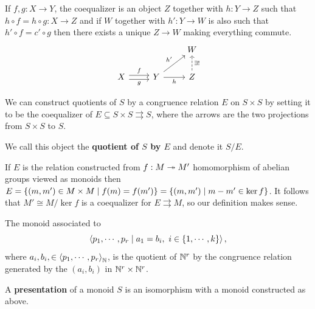 \begin{definition}[Coequalizer]
If $f,g:X\to Y$, the coequalizer is an object $Z$ together with $h:Y\to Z$ such that $h\circ f=h\circ g:X\to Z$ and if $W$ together with $h':Y\to W$ is also such that $h'\circ f=c'\circ g$ then there exists a unique $Z\to W$ making everything commute.
\[\begin{tikzcd}
	&& W \\
	X & Y & Z
	\arrow["f", shift left, from=2-1, to=2-2]
	\arrow["g"', shift right, from=2-1, to=2-2]
	\arrow["{h'}", from=2-2, to=1-3]
	\arrow["h"', from=2-2, to=2-3]
	\arrow["{\exists!}"', dashed, from=2-3, to=1-3]
\end{tikzcd}\]
\end{definition}

\begin{fact}[]
We can construct quotients of $S$ by a congruence relation $E$ on $S\times S$ by setting it to be the coequalizer of $E\subseteq S\times S\rightrightarrows S$, where the arrows are the two projections from $S\times S$ to $S$.

We call this object the \textbf{quotient of $S$ by $E$} and denote it $S/E$.
\end{fact}

\begin{remark}
If $E$ is the relation constructed from $f:M\twoheadrightarrow M'$ homomorphism of abelian groups viewed as monoids then $E=\left\{{(m,m')\in M\times M\mid f(m)=f(m')}\right\}=\left\{{(m,m')\mid m-m'\in \ker f}\right\}$. It follows that $M'\cong M/\ker f$ is a coequalizer for $E\rightrightarrows M$, so our definition makes sense.
\end{remark}


\begin{definition}
The monoid associated to
\[\left\langle {p_1,\cdots, p_r\mid a_1=b_i,\ i\in\left\{{1,\cdots, k}\right\}}\right\rangle,\]
where $a_i,b_i,\in \left\langle {p_1,\cdots, p_r}\right\rangle_{\mathbb{N}}$, is the quotient of $\mathbb{N}^r$ by the congruence relation generated by the $(a_i,b_i)$ in $\mathbb{N}^r\times \mathbb{N}^r$.

A \textbf{presentation} of a monoid $S$ is an isomorphism with a monoid constructed as above.
\end{definition}





